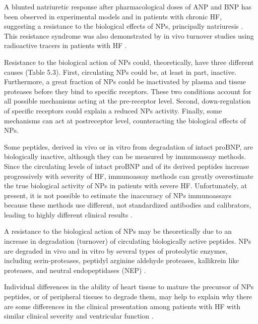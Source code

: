 \documentclass[14pt,a4paper,onecolumn]{extarticle}
\begin{document}
A blunted natriuretic response after pharmacological doses of ANP and BNP has been observed in experimental models and in patients with chronic HF, suggesting a resistance to the biological effects of NPs, principally natriuresis \citep{bib325} \citep{bib333} \citep{bib331}. This resistance syndrome was also demonstrated by in vivo turnover studies using radioactive tracers in patients with HF \citep{bib333}.



Resistance to the biological action of NPs could, theoretically, have three different causes (Table 5.3). First, circulating NPs could be, at least in part, inactive. Furthermore, a great fraction of NPs could be inactivated by plasma and tissue proteases before they bind to specific receptors. These two conditions account for all possible mechanisms acting at the pre-receptor level. Second, down-regulation of specific receptors could explain a reduced NPs activity. Finally, some mechanisms can act at postreceptor level, counteracting the biological effects of NPs.






Some peptides, derived in vivo or in vitro from degradation of intact proBNP, are biologically inactive, although they can be measured by immunoassay methods. Since the circulating levels of intact proBNP and of its derived peptides increase progressively with severity of HF, immunoassay methods can greatly overestimate the true biological activity of NPs in patients with severe HF. Unfortunately, at present, it is not possible to estimate the inaccuracy of NPs immunoassays because these methods use different, not standardized antibodies and calibrators, leading to highly different clinical results \citep{bib36}.



A resistance to the biological action of NPs may be theoretically due to an increase in degradation (turnover) of circulating biologically active peptides. NPs are degraded in vivo and in vitro by several types of proteolytic enzymes, including serin-proteases, peptidyl arginine aldehyde proteases, kallikrein like proteases, and neutral endopeptidases (NEP) \citep{bib335}.



Individual differences in the ability of heart tissue to mature the precursor of NPs peptides, or of peripheral tissues to degrade them, may help to explain why there are some differences in the clinical presentation among patients with HF with similar clinical severity and ventricular function \citep{bib36}.
\end{document}

